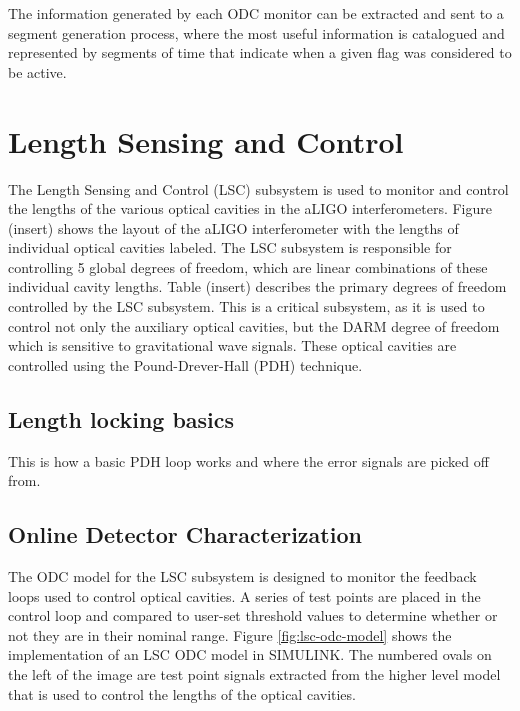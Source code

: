 The information generated by each ODC monitor can be extracted and sent to a segment
generation process, where the most useful information is catalogued and represented by
segments of time that indicate when a given flag was considered to be active.

\section{Length Sensing and Control}

The Length Sensing and Control (LSC) subsystem is 
used to monitor and control the lengths of the various optical cavities in the 
aLIGO interferometers. Figure (insert) shows the layout 
of the aLIGO interferometer with the lengths of individual optical cavities 
labeled. The LSC subsystem is responsible for controlling 5 global degrees of freedom, 
which are linear combinations of these individual cavity lengths. Table (insert) 
describes the primary degrees of freedom controlled by the LSC subsystem. 
This is a critical subsystem, as it is used to control
not only the auxiliary optical cavities, but the DARM degree of freedom which
is sensitive to gravitational wave signals.
These optical cavities are controlled using the Pound-Drever-Hall (PDH) 
technique.

\subsection{Length locking basics}

This is how a basic PDH loop works and where the error signals are picked 
off from.

\subsection{Online Detector Characterization}

The ODC model for the LSC subsystem is designed to monitor the feedback 
loops used to control optical cavities. A series of test points are placed 
in the control loop and compared to user-set threshold values to determine 
whether or not they are in their nominal range. 
Figure \ref{fig:lsc-odc-model} shows the implementation of an LSC ODC 
model in SIMULINK. The numbered ovals on the left of the image are test point 
signals extracted from the higher level model that is used to control the 
lengths of the optical cavities.

